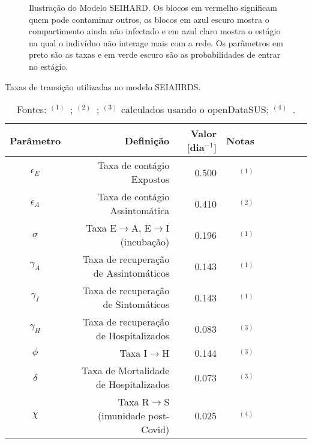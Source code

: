\begin{figure}[ht]
  \captionsetup{font=small}
  \caption*{Ilustração do Modelo SEIHARD. Os blocos em vermelho significam quem pode contaminar outros, os blocos em azul escuro mostra o compartimento ainda não infectado e em azul claro mostra o estágio na qual o indivíduo não interage mais com a rede. Os parâmetros em preto são as taxas e em verde escuro são as probabilidades de entrar no estágio.}
  \label{img:Contagio}
\end{figure}

\begin{table}[H]
    \captionsetup{width=13.5cm}
    \caption{Taxas de transição utilizadas no modelo SEIAHRDS.}
    \centering
    \begin{tabular}{crrrrrrrr}
        \toprule
        Parâmetro & Definição & Valor [dia\(^{-1}\)] & Notas \\
        \midrule
        \midrule
        \(\epsilon_E\) & Taxa de contágio Expostos & 0.500 & \(^{(1)}\) \\
        \(\epsilon_A\) & Taxa de contágio Assintomática & 0.410 & \(^{(2)}\) \\
        \(\sigma\) & Taxa E\(\rightarrow\)A, E\(\rightarrow\)I (incubação) & 0.196 & \(^{(1)}\) \\
        \(\gamma_A\) & Taxa de recuperação de Assintomáticos & 0.143 & \(^{(1)}\) \\
        \(\gamma_I\) & Taxa de recuperação de Sintomáticos & 0.143 & \(^{(1)}\) \\
        \(\gamma_H\) & Taxa de recuperação de Hospitalizados & 0.083 & \(^{(3)}\) \\
        \(\phi\) & Taxa I\(\rightarrow\)H & 0.144 & \(^{(3)}\) \\
        \(\delta\) & Taxa de Mortalidade de Hospitalizados & 0.073 & \(^{(3)}\) \\
        \(\chi\) & Taxa R\(\rightarrow\)S (imunidade post-Covid) & 0.025 & \(^{(4)}\) \\
        \bottomrule
    \end{tabular}
    \caption*{Fontes: \(^{(1)}\)~\cite{Eikenberry2020}; \(^{(2)}\)~\cite{SP}; \(^{(3)}\) calculados usando o openDataSUS; \(^{(4)}\)~\cite{Kirkcaldy2020}.}
    \label{tabela:taxas_transicao_adaptada}
\end{table}


